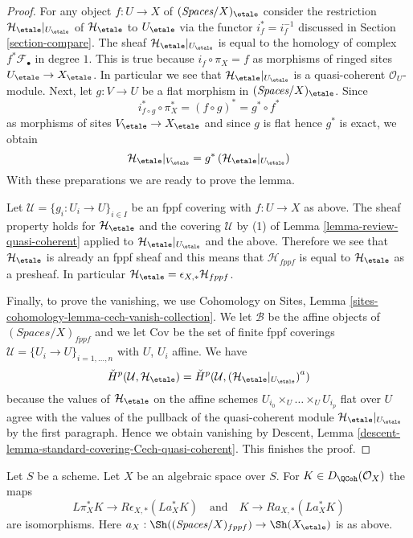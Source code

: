 \begin{proof}
For any object $f : U \to X$ of $(\textit{Spaces}/X)_\etale$
consider the restriction
$\mathcal{H}_\etale|_{U_\etale}$ of $\mathcal{H}_\etale$ to $U_\etale$ via
the functor $i_f^* = i_f^{-1}$ discussed in Section \ref{section-compare}.
The sheaf $\mathcal{H}_\etale|_{U_\etale}$
is equal to the homology of complex $f^*\mathcal{F}_\bullet$ in degree $1$.
This is true because $i_f \circ \pi_X = f$ as morphisms of ringed sites
$U_\etale \to X_\etale$. In particular we see that
$\mathcal{H}_\etale|_{U_\etale}$ is a quasi-coherent $\mathcal{O}_U$-module.
Next, let $g : V \to U$ be a flat
morphism in $(\textit{Spaces}/X)_\etale$. Since
$$
i_{f \circ g}^* \circ \pi_X^* = (f \circ g)^* = g^* \circ f^*
$$
as morphisms of sites $V_\etale \to X_\etale$ and since $g$ is flat
hence $g^*$ is exact, we obtain
$$
\mathcal{H}_\etale|_{V_\etale} =
g^*\left(\mathcal{H}_\etale|_{U_\etale}\right)
$$
With these preparations we are ready to prove the lemma.

\medskip\noindent
Let $\mathcal{U} = \{g_i : U_i \to U\}_{i \in I}$ be an fppf covering
with $f : U \to X$ as above. The sheaf property holds for
$\mathcal{H}_\etale$ and the covering $\mathcal{U}$
by (1) of Lemma \ref{lemma-review-quasi-coherent}
applied to $\mathcal{H}_\etale|_{U_\etale}$ and the above.
Therefore we see that $\mathcal{H}_\etale$ is already an fppf
sheaf and this means that $\mathcal{H}_{fppf}$ is
equal to $\mathcal{H}_\etale$
as a presheaf. In particular
$\mathcal{H}_\etale = \epsilon_{X, *}\mathcal{H}_{fppf}$.

\medskip\noindent
Finally, to prove the vanishing, we use
Cohomology on Sites, Lemma \ref{sites-cohomology-lemma-cech-vanish-collection}.
We let $\mathcal{B}$ be the affine objects of
$(\textit{Spaces}/X)_{fppf}$ and we let
$\text{Cov}$ be the set of finite fppf coverings
$\mathcal{U} = \{U_i \to U\}_{i = 1, \ldots, n}$ with $U$, $U_i$ affine.
We have
$$
{\check H}^p(\mathcal{U}, \mathcal{H}_\etale) =
{\check H}^p(\mathcal{U}, \left(\mathcal{H}_\etale|_{U_\etale}\right)^a)
$$
because the values of $\mathcal{H}_\etale$ on the
affine schemes $U_{i_0} \times_U \ldots \times_U U_{i_p}$
flat over $U$ agree with the values of the pullback
of the quasi-coherent module $\mathcal{H}_\etale|_{U_\etale}$ by
the first paragraph. Hence we obtain vanishing by
Descent, Lemma \ref{descent-lemma-standard-covering-Cech-quasi-coherent}.
This finishes the proof.
\end{proof}

\begin{lemma}
\label{lemma-cohomological-descent-etale-fppf-modules-unbounded}
Let $S$ be a scheme. Let $X$ be an algebraic space over $S$.
For $K \in D_\QCoh(\mathcal{O}_X)$ the maps
$$
L\pi_X^*K \longrightarrow R\epsilon_{X, *}(La_X^*K)
\quad\text{and}\quad
K \longrightarrow Ra_{X, *}(La_X^*K)
$$
are isomorphisms. Here
$a_X : \Sh((\textit{Spaces}/X)_{fppf}) \to \Sh(X_\etale)$ is as above.
\end{lemma}


